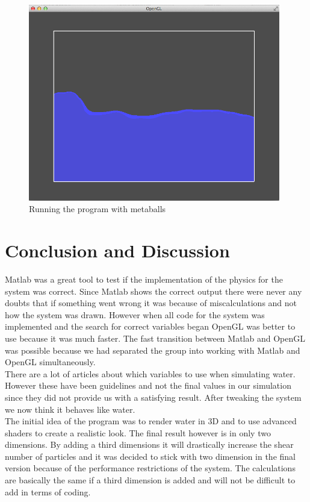 \documentclass[a4paper,12pt,twoside,final]{report}
\begin{document}
\begin{figure}[H]
\begin{center}
    \includegraphics[width=11cm]{figs/image_1.png} 
\end{center}
\caption{Running the program with metaballs}
\label{model_block}
\end{figure}



\chapter{Conclusion and Discussion}

Matlab was a great tool to test if the implementation of the physics for the system was correct. Since Matlab shows the correct output there were never any doubts that if something went wrong it was because of miscalculations and not how the system was drawn. However when all code for the system was implemented and the search for correct variables began OpenGL was better to use because it was much faster. The fast transition between Matlab and OpenGL was possible because we had separated the group into working with Matlab and OpenGL simultaneously. \\

\noindent There are a lot of articles about which variables to use when simulating water. However these have been guidelines and not the final values in our simulation since they did not provide us with a satisfying result. After tweaking the system we now think it behaves like water. \\

\noindent The initial idea of the program was to render water in 3D and to use advanced shaders to create a realistic look. The final result however is in only two dimensions. By adding a third dimensions it will drastically increase the shear number of particles and it was decided to stick with two dimension in the final version because of the performance restrictions of the system. The calculations are basically the same if a third dimension is added and will not be difficult to add in terms of coding. \\
\end{document}
